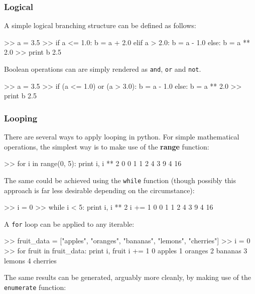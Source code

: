 \subsubsection{Logical}

A simple logical branching structure can be defined as follows:

\begin{python}[frame=single]
>> a = 3.5
>> if a <= 1.0:
       b = a + 2.0
   elif a > 2.0:
       b = a - 1.0
   else:
       b = a ** 2.0
>> print b
2.5
\end{python}

Boolean operations can are simply rendered as \verb=and=, \verb=or= and \verb=not=.
\begin{python}[frame=single]
>> a = 3.5
>> if (a <= 1.0) or (a > 3.0):
       b = a - 1.0
   else:
       b = a ** 2.0
>> print b
2.5
\end{python}

\subsubsection{Looping}

There are several ways to apply looping in python. For simple mathematical operations, the simplest way is to make use of the \textbf{range} function:

\begin{python}[frame=single]
>> for i in range(0, 5):
       print i, i ** 2
0  0
1  1
2  4
3  9
4  16
\end{python}

The same could be achieved using the \verb=while= function (though possibly this approach is far less desirable depending on the circumstance):

\begin{python}[frame=single]
>> i = 0
>> while i < 5:
       print i, i ** 2
       i += 1
0  0
1  1
2  4
3  9
4  16
\end{python}

A \verb=for= loop can be applied to any iterable:

\begin{python}[frame=single]
>> fruit_data = ["apples", "oranges", "bananas", "lemons", 
                 "cherries"]
>> i = 0
>> for fruit in fruit_data:
       print i, fruit
       i += 1
0  apples
1  oranges
2  bananas
3  lemons
4  cherries 
\end{python}

The same results can be generated, arguably more cleanly, by making use of the \verb=enumerate= function:

